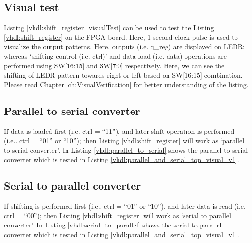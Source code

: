 

\subsection{Visual test}

Listing \ref{vhdl:shift_register_visualTest} can be used to test the Listing \ref{vhdl:shift_register} on the FPGA board. Here, 1 second clock pulse is used to visualize the output patterns. Here, outputs (i.e. q\_reg) are displayed on LEDR; whereas `shifting-control (i.e. ctrl)' and data-load (i.e. data) operations are performed using SW[16:15] and SW[7:0] respectively. Here, we can see the shifting of LEDR pattern towards right or left based on SW[16:15] combination. Please read Chapter \ref{ch:VisualVerification} for better understanding of the listing.



\subsection{Parallel to serial converter}
If data is loaded first (i.e. ctrl = ``11''), and later shift operation is performed (i.e.. ctrl = ``01'' or ``10''); then Listing \ref{vhdl:shift_register} will work as `parallel to serial converter'. In Listing \ref{vhdl:parallel_to_serial} shows the parallel to serial converter which is tested in Listing \ref{vhdl:parallel_and_serial_top_visual_v1}.




\subsection{Serial to parallel converter}
If shifting is performed first (i.e.. ctrl = ``01'' or ``10''), and later data is read (i.e. ctrl = ``00''); then Listing \ref{vhdl:shift_register} will work as `serial to parallel converter'. In Listing \ref{vhdl:serial_to_parallel} shows the serial to parallel converter which is tested in Listing \ref{vhdl:parallel_and_serial_top_visual_v1}.



